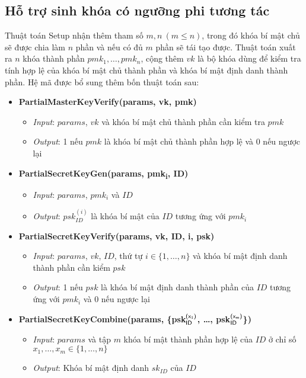 \documentclass[class=report, crop=false]{standalone}
\begin{document}
		\subsection{Hỗ trợ sinh khóa có ngưỡng phi tương tác}
			Thuật toán \textsf{Setup} nhận thêm tham số $m, n \ (m \leq n)$, trong đó khóa bí mật chủ sẽ được chia làm $n$ phần và nếu có đủ $m$ phần sẽ tái tạo được. Thuật toán xuất ra $n$ khóa thành phần $pmk_1, \dots, pmk_n$, cộng thêm $vk$ là bộ khóa dùng để kiểm tra tính hợp lệ của khóa bí mật chủ thành phần và khóa bí mật định danh thành phần. Hệ mã được bổ sung thêm bốn thuật toán sau:
			\vspace{-0.5cm}
			\begin{itemize}
				\item[] {\sffamily\bfseries PartialMasterKeyVerify(params, vk, pmk)}
				\begin{itemize}
					\item[\textbullet] \textit{Input}: $params$, $vk$ và khóa bí mật chủ thành phần cần kiểm tra $pmk$
					\item[\textbullet] \textit{Output}: 1 nếu $pmk$ là khóa bí mật chủ thành phần hợp lệ và 0 nếu ngược lại
				\end{itemize}
				\item[] {\sffamily\bfseries PartialSecretKeyGen(params, pmk\textsubscript{i}, ID)}
				\begin{itemize}
					\item[\textbullet] \textit{Input}: $params$, $pmk_i$ và $ID$
					\item[\textbullet] \textit{Output}: $psk_{ID}^{(i)}$ là khóa bí mật của $ID$ tương ứng với $pmk_i$
				\end{itemize}
				\item[] {\sffamily\bfseries PartialSecretKeyVerify(params, vk, ID, i, psk)}
				\begin{itemize}
					\item[\textbullet] \textit{Input}: $params$, $vk$, $ID$, thứ tự $i \in \{1, \dots, n \}$ và khóa bí mật định danh thành phần cần kiểm $psk$
					\item[\textbullet] \textit{Output}: 1 nếu $psk$ là khóa bí mật định danh thành phần của $ID$ tương ứng với $pmk_i$ và 0 nếu ngược lại
				\end{itemize}
				\newpage
				\item[] {\sffamily\bfseries PartialSecretKeyCombine(params, \{psk$_{\textsf{ID}}^{\textsf{(x\textsubscript{1})}}$, \dots, psk$_{\textsf{ID}}^{\textsf{(x\textsubscript{m})}}$\})}
				\begin{itemize}
					\item[\textbullet] \textit{Input}: $params$ và tập $m$ khóa bí mật thành phần hợp lệ của $ID$ ở chỉ số $x_1, \dots, x_m \in \{1, \dots, n \}$
					\item[\textbullet] \textit{Output}: Khóa bí mật định danh $sk_{ID}$ của $ID$
				\end{itemize}
			\end{itemize}
\end{document}
